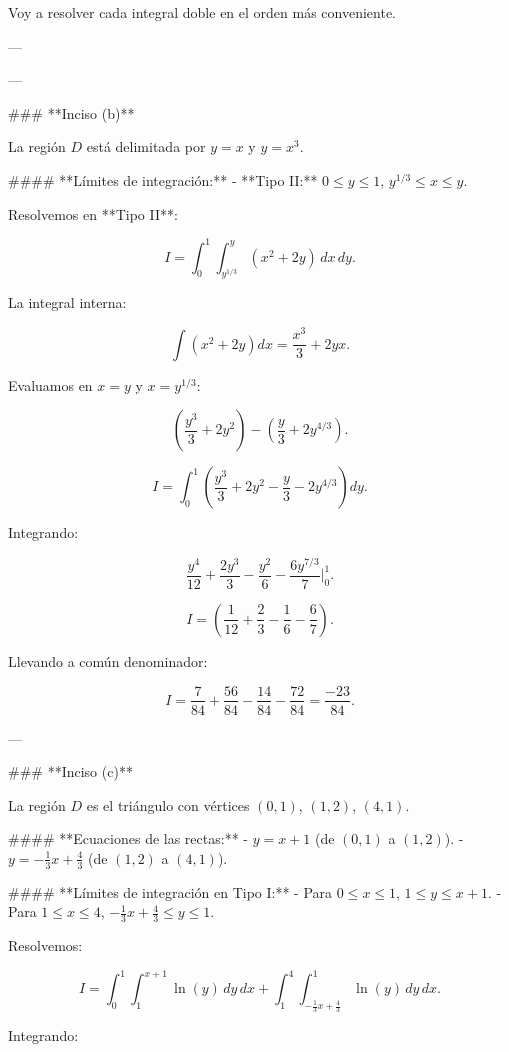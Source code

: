Voy a resolver cada integral doble en el orden más conveniente.  

---



---

### **Inciso (b)**  

La región \( D \) está delimitada por \( y = x \) y \( y = x^3 \).  

#### **Límites de integración:**  
- **Tipo II:** \( 0 \leq y \leq 1 \), \( y^{1/3} \leq x \leq y \).  

Resolvemos en **Tipo II**:  

\[
I = \int_0^1 \int_{y^{1/3}}^y (x^2 + 2y) \, dx \, dy.
\]

La integral interna:

\[
\int (x^2 + 2y) dx = \frac{x^3}{3} + 2yx.
\]

Evaluamos en \( x = y \) y \( x = y^{1/3} \):

\[
\left( \frac{y^3}{3} + 2y^2 \right) - \left( \frac{y}{3} + 2y^{4/3} \right).
\]

\[
I = \int_0^1 \left( \frac{y^3}{3} + 2y^2 - \frac{y}{3} - 2y^{4/3} \right) dy.
\]

Integrando:

\[
\frac{y^4}{12} + \frac{2y^3}{3} - \frac{y^2}{6} - \frac{6y^{7/3}}{7} \Big|_0^1.
\]

\[
I = \left( \frac{1}{12} + \frac{2}{3} - \frac{1}{6} - \frac{6}{7} \right).
\]

Llevando a común denominador:

\[
I = \frac{7}{84} + \frac{56}{84} - \frac{14}{84} - \frac{72}{84} = \frac{-23}{84}.
\]

---

### **Inciso (c)**  

La región \( D \) es el triángulo con vértices \( (0,1) \), \( (1,2) \), \( (4,1) \).  

#### **Ecuaciones de las rectas:**  
- \( y = x + 1 \) (de \( (0,1) \) a \( (1,2) \)).  
- \( y = -\frac{1}{3} x + \frac{4}{3} \) (de \( (1,2) \) a \( (4,1) \)).  

#### **Límites de integración en Tipo I:**  
- Para \( 0 \leq x \leq 1 \), \( 1 \leq y \leq x + 1 \).  
- Para \( 1 \leq x \leq 4 \), \( -\frac{1}{3} x + \frac{4}{3} \leq y \leq 1 \).  

Resolvemos:

\[
I = \int_0^1 \int_1^{x+1} \ln(y) \, dy \, dx + \int_1^4 \int_{-\frac{1}{3}x+\frac{4}{3}}^1 \ln(y) \, dy \, dx.
\]

Integrando:

